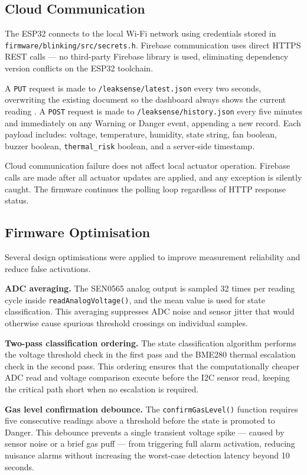 \documentclass[a4paper,10pt,conference,onecolumn]{IEEEtran}
\begin{document}
\subsection{Cloud Communication}

The ESP32 connects to the local Wi-Fi network using credentials stored in
\texttt{firmware/blinking/src/secrets.h}. Firebase communication uses direct
HTTPS REST calls --- no third-party Firebase library is used, eliminating
dependency version conflicts on the ESP32 toolchain.

A \texttt{PUT} request is made to \texttt{/leaksense/latest.json} every two
seconds, overwriting the existing document so the dashboard always shows the
current reading \cite{firebase2024}. A \texttt{POST} request is made to
\texttt{/leaksense/history.json} every five minutes and immediately on any
Warning or Danger event, appending a new record. Each payload includes:
voltage, temperature, humidity, state string, fan boolean, buzzer boolean,
\texttt{thermal\_risk} boolean, and a server-side timestamp.

Cloud communication failure does not affect local actuator operation. Firebase
calls are made after all actuator updates are applied, and any exception is
silently caught. The firmware continues the polling loop regardless of HTTP
response status.

\subsection{Firmware Optimisation}

Several design optimisations were applied to improve measurement
reliability and reduce false activations.

\textbf{ADC averaging.} The SEN0565 analog output is sampled 32 times
per reading cycle inside \texttt{readAnalogVoltage()}, and the mean
value is used for state classification. This averaging suppresses
ADC noise and sensor jitter that would otherwise cause spurious
threshold crossings on individual samples.

\textbf{Two-pass classification ordering.} The state classification
algorithm performs the voltage threshold check in the first pass and
the BME280 thermal escalation check in the second pass. This ordering
ensures that the computationally cheaper ADC read and voltage
comparison execute before the I2C sensor read, keeping the critical
path short when no escalation is required.

\textbf{Gas level confirmation debounce.} The \texttt{confirmGasLevel()}
function requires five consecutive readings above a threshold before
the state is promoted to Danger. This debounce prevents a single
transient voltage spike --- caused by sensor noise or a brief gas
puff --- from triggering full alarm activation, reducing nuisance
alarms without increasing the worst-case detection latency beyond
10 seconds.
\end{document}
